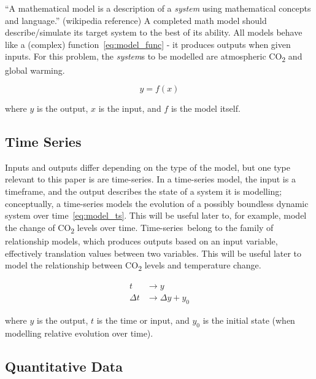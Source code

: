 \documentclass{mcmthesis}
\begin{document}
    ``A mathematical model is a description of a \textit{system} using mathematical concepts and language.'' (wikipedia reference) A completed math model should describe/simulate it\textquotesingle s target system to the best of its ability. All models behave like a (complex) function~\eqref{eq:model_func} - it produces outputs when given inputs. For this problem, the \textit{system}s to be modelled are atmospheric CO\textsubscript{2} and global warming.

    \begin{equation}
        y = f(x)
        \label{eq:model_func}
    \end{equation}

    \noindent where $y$ is the output, $x$ is the input, and $f$ is the model itself.

    \subsection{Time Series}

    Inputs and outputs differ depending on the type of the model, but one type relevant to this paper is are time-series\textquotesingle . In a time-series model, the input is a timeframe, and the output describes the state of a system it is modelling; conceptually, a time-series models the evolution of a possibly boundless dynamic system over time~\eqref{eq:model_ts}. This will be useful later to, for example, model the change of CO\textsubscript{2} levels over time. Time-series\textquotesingle~belong to the family of relationship models, which produces outputs based on an input variable, effectively translation values between two variables. This will be useful later to model the relationship between CO\textsubscript{2} levels and temperature change.

    \begin{equation}
        \begin{aligned}
            t & \rightarrow y \\
            \Delta t & \rightarrow \Delta y + y_0
        \end{aligned}
        \label{eq:model_ts}
    \end{equation}

    \noindent where $y$ is the output, $t$ is the time or input, and $y_0$ is the initial state (when modelling relative evolution over time).

    \subsection{Quantitative Data}
\end{document}
